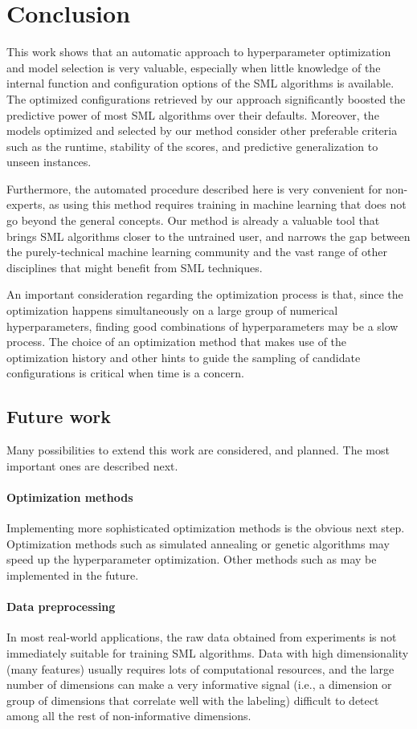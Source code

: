 \chapter{Conclusion}

This work shows that an automatic approach to hyperparameter optimization and model selection is
very valuable, especially when little knowledge of the internal function and configuration options of
the SML algorithms is available. The optimized configurations retrieved by our approach
significantly boosted the predictive power of most SML algorithms over their defaults. Moreover,
the models optimized and selected by our method consider other preferable criteria such as the
runtime, stability of the scores, and predictive generalization to unseen instances.

Furthermore, the automated procedure described here is very convenient for non-experts,
as using this method requires training in machine learning that does not go
beyond the general concepts. Our method is already a valuable tool that brings SML
algorithms closer to the untrained user, and narrows the gap between the purely-technical
machine learning community and the vast range of other disciplines that might benefit from SML
techniques.

An important consideration regarding the optimization process is that, since the optimization
happens simultaneously on a large group of numerical hyperparameters, finding good combinations of
hyperparameters may be a slow process. The choice of an optimization method that makes use of the
optimization history and other hints to guide the sampling of candidate configurations is critical
when time is a concern.

\section{Future work}
	Many possibilities to extend this work are considered, and planned. The most important ones are
	described next.

	\subsubsection{Optimization methods}
	Implementing more sophisticated optimization methods is the obvious next step. Optimization methods such
	as simulated annealing or genetic algorithms may speed up the hyperparameter optimization. Other
	methods such as may be implemented in the future.

	\subsubsection{Data preprocessing}
	In most real-world applications, the raw data obtained from experiments is not immediately suitable for
	training SML algorithms. Data with high dimensionality (many features) usually requires lots of
	computational resources, and the large number of dimensions can make a very informative signal (i.e., a
	dimension or group of dimensions that correlate well with the labeling) difficult to detect among
	all the rest of non-informative dimensions.
	
